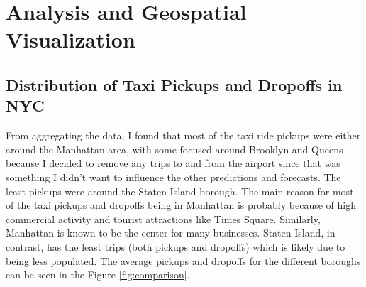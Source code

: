 \documentclass[11pt]{article}
\begin{document}
\section{Analysis and Geospatial Visualization}
\subsection{Distribution of Taxi Pickups and Dropoffs in NYC}
\label{subsec:distribution}
From aggregating the data, I found that most of the taxi ride pickups were either around the Manhattan area, with some focused around Brooklyn and Queens because I decided to remove any trips to and from the airport since that was something I didn’t want to influence the other predictions and forecasts. The least pickups were around the Staten Island borough. 
The main reason for most of the taxi pickups and dropoffs being in Manhattan is probably because of high commercial activity and tourist attractions like Times Square. Similarly, Manhattan is known to be the center for many businesses. Staten Island, in contrast, has the least trips (both pickups and dropoffs) which is likely due to being less populated. The average pickups and dropoffs for the different boroughs can be seen in the Figure \ref{fig:comparison}.
\end{document}
